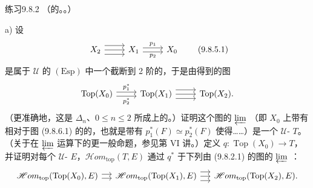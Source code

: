 \begin{SGAresult}{练习}{9.8.2}
（的。。）

a) 设
\[
\begin{tikzcd}
X_2\arrow[r,shift left=1.2ex]\arrow[r]\arrow[r,shift right=1.2ex]&X_1\arrow[r,shift left,"p_1"]\arrow[r,shift right,"p_2"']&X_0
\end{tikzcd}\tag{9.8.5.1}
\]
是属于 $\mathcal U$ 的 $(\mathrm{Esp})$ 中一个截断到 2 阶的，于是由得到的图
\[
\begin{tikzcd}
\operatorname{Top}(X_0)\arrow[r,shift left,"p_1^*"]\arrow[r,shift right,"p_2^*"']&\operatorname{Top}(X_1)\arrow[r,shift left=1.2ex]\arrow[r]\arrow[r,shift right=1.2ex]&\operatorname{Top}(X_2).
\end{tikzcd}
\]
（更准确地，这是 $\Delta_n$、$0\leq n\leq2$ 所成上的。）证明这个图的 $\varprojlim$ （即 $X_0$ 上带有相对于图 (9.8.6.1) 的的，也就是带有 $p_1^*(F)\simeq p_2^*(F)$ 使得……）是一个 $\mathcal U$- $T$。（关于在 $\varprojlim$ 运算下的更一般命题，参见第 VI 讲。）定义 $q:\operatorname{Top}(X_0)\to T$，并证明对每个 $\mathcal U$- $E$，$\mathscr{H}om_{\mathrm{top}}(T,E)$ 通过 $q^*$ 于下列由 (9.8.2.1) 的图的 $\varprojlim$ ：
\[
\begin{tikzcd}[column sep=small]
\mathscr{H}om_{\mathrm{top}}(\operatorname{Top}(X_0),E)\arrow[r,shift left]\arrow[r,shift right]&\mathscr{H}om_{\mathrm{top}}(\operatorname{Top}(X_1),E)\arrow[r,shift left=1.2ex]\arrow[r]\arrow[r,shift right=1.2ex]&\mathscr{H}om_{\mathrm{top}}(\operatorname{Top}(X_2),E).
\end{tikzcd}
\]

\end{SGAresult}
